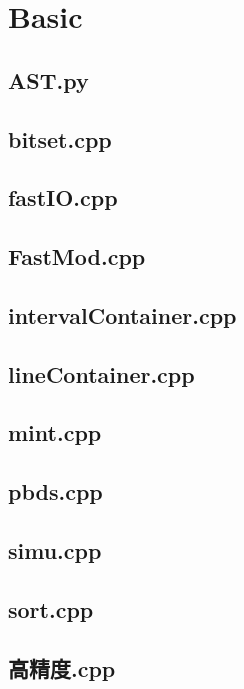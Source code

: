 \section{Basic}

\subsection{AST.py}


\subsection{bitset.cpp}


\subsection{fastIO.cpp}


\subsection{FastMod.cpp}


\subsection{intervalContainer.cpp}


\subsection{lineContainer.cpp}


\subsection{mint.cpp}


\subsection{pbds.cpp}


\subsection{simu.cpp}


\subsection{sort.cpp}


\subsection{高精度.cpp}


